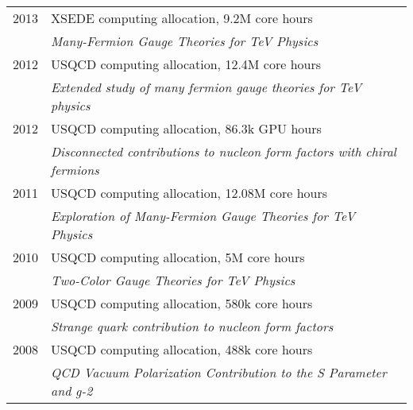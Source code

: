 \begin{spacelistout}
\begin{tabular}[t]{cl}
      2013 & XSEDE computing allocation, 9.2M core hours                                                                                                       \\ %
           & \textit{Many-Fermion Gauge Theories for TeV Physics}                                                                                              \\[6 pt]
      2012 & USQCD computing allocation, 12.4M core hours                                                                                                      \\ %
           & \textit{Extended study of many fermion gauge theories for TeV physics}                                                                            \\[6 pt]
      2012 & USQCD computing allocation, 86.3k GPU hours                                                                                                       \\ %
           & \textit{Disconnected contributions to nucleon form factors with chiral fermions}                                                                  \\[6 pt]
      2011 & USQCD computing allocation, 12.08M core hours                                                                                                     \\ %
           & \textit{Exploration of Many-Fermion Gauge Theories for TeV Physics}                                                                               \\[6 pt]
      2010 & USQCD computing allocation, 5M core hours                                                                                                         \\ %
           & \textit{Two-Color Gauge Theories for TeV Physics}                                                                                                 \\[6 pt]
      2009 & USQCD computing allocation, 580k core hours                                                                                                       \\ %
           & \textit{Strange quark contribution to nucleon form factors}                                                                                       \\[6 pt]
      2008 & USQCD computing allocation, 488k core hours                                                                                                       \\ %
           & \textit{QCD Vacuum Polarization Contribution to the S Parameter and g-2}                                                                          \\[6 pt]
    \end{tabular}
\end{spacelistout}
